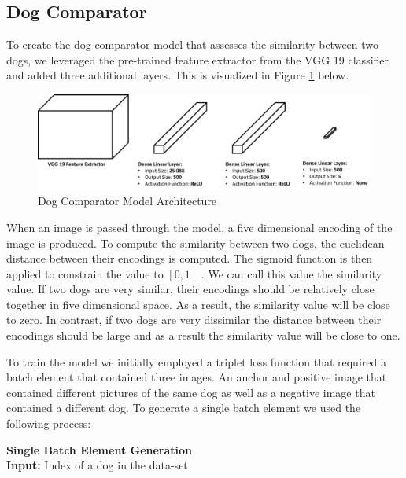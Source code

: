 \documentclass{article}
\begin{document}
\begin{enumerate}
\subsection{Dog Comparator}
To create the dog comparator model that assesses the similarity between two dogs, we leveraged the pre-trained feature extractor from the VGG 19 classifier \cite{SimonyanKaren2014VDCN} and added three additional layers.  This is visualized in Figure \ref{fig:x comparator} below.

\begin{figure}[h]
\centering
	\includegraphics[scale=0.4]{final-report-images/dog_comparator.png}
\caption{Dog Comparator Model Architecture}
\label{fig:x comparator}
\end{figure}

\noindent When an image is passed through the model, a five dimensional encoding of the image is produced.  To compute the similarity between two dogs, the euclidean distance between their encodings is computed.  The sigmoid function is then applied to constrain the value to $[0,1]$ .  We can call this value the similarity value.  If two dogs are very similar, their encodings should be relatively close together in five dimensional space.  As a result, the similarity value will be close to zero.  In contrast, if two dogs are very dissimilar the distance between their encodings should be large and as a result the similarity value will be close to one.  

To train the model we initially employed a triplet loss function that required a batch element that contained three images.  An anchor and positive image that contained different pictures of the same dog as well as a negative image that contained a different dog.  To generate a single batch element we used the following process: \\


    \begin{minipage}{1\textwidth}%
     \noindent \textbf{Single Batch Element Generation}  \\
    
      \noindent \textbf{Input:} Index of a dog in the data-set \\
      

\end{minipage}
\end{enumerate}
\end{document}
